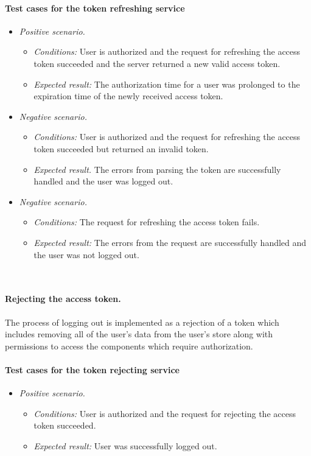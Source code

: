 \paragraph*{Test cases for the token refreshing service} 
\begin{itemize}
    \item \emph{Positive scenario.} 
        \begin{itemize}
            \item \emph{Conditions:} User is authorized and the request for refreshing the access token succeeded and the server returned a new valid access token.
            \item \emph{Expected result:} The authorization time for a user was prolonged to the expiration time of the newly received access token.
        \end{itemize}
    \item \emph{Negative scenario.} 
        \begin{itemize}
            \item \emph{Conditions:} User is authorized and the request for refreshing the access token succeeded but returned an invalid token.
            \item \emph{Expected result.} The errors from parsing the token are successfully handled and the user was logged out.
        \end{itemize}
    \item \emph{Negative scenario.} 
        \begin{itemize}
            \item \emph{Conditions:} The request for refreshing the access token fails.
            \item \emph{Expected result:} The errors from the request are successfully handled and the user was not logged out.
        \end{itemize}
\end{itemize}

\


\paragraph*{Rejecting the access token.}The process of logging out is implemented as a rejection of a token which includes removing all of the user's data from the user's store along with permissions to access the components which require authorization.

\paragraph*{Test cases for the token rejecting service} 
\begin{itemize}
    \item \emph{Positive scenario.} 
        \begin{itemize}
            \item \emph{Conditions:} User is authorized and the request for rejecting the access token succeeded.
            \item \emph{Expected result:} User was successfully logged out.
        \end{itemize}
\end{itemize}

